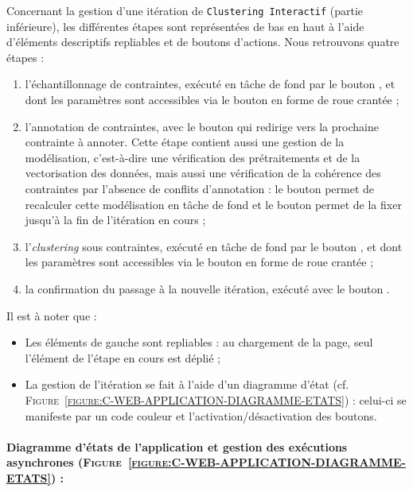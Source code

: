 		Concernant la gestion d'une itération de \texttt{Clustering Interactif} (partie inférieure), les différentes étapes sont représentées de bas en haut à l'aide d’éléments descriptifs repliables et de boutons d'actions.
		Nous retrouvons quatre étapes :
		\begin{enumerate}
			\item l'échantillonnage de contraintes, exécuté en tâche de fond par le bouton , et dont les paramètres sont accessibles via le bouton en forme de roue crantée ;
			\item l'annotation de contraintes, avec le bouton  qui redirige vers la prochaine contrainte à annoter.
			Cette étape contient aussi une gestion de la modélisation, c'est-à-dire une vérification des prétraitements et de la vectorisation des données, mais aussi une vérification de la cohérence des contraintes par l'absence de conflits d'annotation : le bouton  permet de recalculer cette modélisation en tâche de fond et le bouton  permet de la fixer jusqu'à la fin de l'itération en cours ;
			\item l'\textit{clustering} sous contraintes, exécuté en tâche de fond par le bouton , et dont les paramètres sont accessibles via le bouton en forme de roue crantée ;
			\item la confirmation du passage à la nouvelle itération, exécuté avec le bouton .
		\end{enumerate}
		
		Il est à noter que :
		\begin{itemize}
			\item Les éléments de gauche sont repliables : au chargement de la page, seul l'élément de l'étape en cours est déplié ;
			\item La gestion de l'itération se fait à l'aide d'un diagramme d'état (cf. \textsc{Figure~\ref{figure:C-WEB-APPLICATION-DIAGRAMME-ETATS}}) : celui-ci se manifeste par un code couleur et l'activation/désactivation des boutons.
		\end{itemize}
	
	
	\newpage
	\paragraph{Diagramme d'états de l'application et gestion des exécutions asynchrones (\textsc{Figure~\ref{figure:C-WEB-APPLICATION-DIAGRAMME-ETATS}}) :}
		
